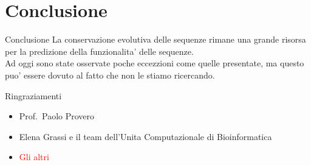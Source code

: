 \documentclass{beamer}
\newcommand{\warn}[1]{\textcolor{red}{#1}}
\begin{document}
    \section{Conclusione}

    \begin{frame}[plain]{Conclusione}
        La conservazione evolutiva delle sequenze rimane una grande risorsa
        per la predizione della funzionalita' delle sequenze.\\
        Ad oggi sono state osservate poche eccezzioni come quelle presentate,
        ma questo puo' essere dovuto al fatto che non le stiamo ricercando.\\
    \end{frame}


    \begin{frame}[plain]{Ringraziamenti}
        \begin{itemize}
            \item Prof.\ Paolo Provero
            \item Elena Grassi e il team dell'Unita Computazionale di Bioinformatica
            \item \warn{Gli altri}
        \end{itemize}
    \end{frame}
\end{document}
